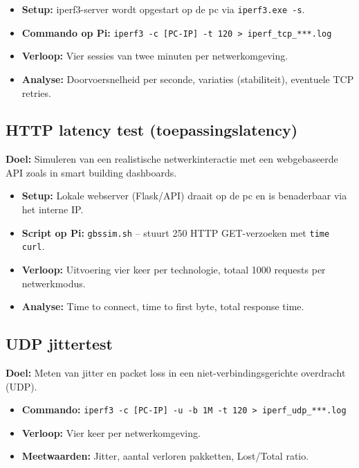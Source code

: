 \begin{itemize}
    \item \textbf{Setup:} iperf3-server wordt opgestart op de pc via \texttt{iperf3.exe -s}.
    \item \textbf{Commando op Pi:} \texttt{iperf3 -c [PC-IP] -t 120 > iperf\_tcp\_***.log}
    \item \textbf{Verloop:} Vier sessies van twee minuten per netwerkomgeving.
    \item \textbf{Analyse:} Doorvoersnelheid per seconde, variaties (stabiliteit), eventuele TCP retries.
\end{itemize}

\subsection{HTTP latency test (toepassingslatency)}
\textbf{Doel:} Simuleren van een realistische netwerkinteractie met een webgebaseerde API zoals in smart building dashboards.

\begin{itemize}
    \item \textbf{Setup:} Lokale webserver (Flask/API) draait op de pc en is benaderbaar via het interne IP.
    \item \textbf{Script op Pi:} \texttt{gbssim.sh} – stuurt 250 HTTP GET-verzoeken met \texttt{time curl}.
    \item \textbf{Verloop:} Uitvoering vier keer per technologie, totaal 1000 requests per netwerkmodus.
    \item \textbf{Analyse:} Time to connect, time to first byte, total response time.
\end{itemize}

\subsection{UDP jittertest}
\textbf{Doel:} Meten van jitter en packet loss in een niet-verbindingsgerichte overdracht (UDP).

\begin{itemize}
    \item \textbf{Commando:} \texttt{iperf3 -c [PC-IP] -u -b 1M -t 120 > iperf\_udp\_***.log}
    \item \textbf{Verloop:} Vier keer per netwerkomgeving.
    \item \textbf{Meetwaarden:} Jitter, aantal verloren pakketten, Lost/Total ratio.
\end{itemize}


